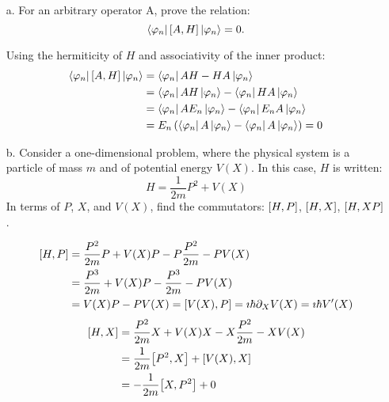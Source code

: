 \documentclass[a4paper,twoside]{article}
\begin{document}
\begin{itemize}
    \item[a.] For an arbitrary operator A, prove the relation:
        \begin{equation}
            \bra{\varphi_n} \comm{A}{H} \ket{\varphi_n} = 0.
        \end{equation}
        \begin{problem}
            Using the hermiticity of $ H $ and associativity of the inner product:
            \begin{align}
                \bra{\varphi_n} \comm{A}{H} \ket{\varphi_n} &= \bra{\varphi_n} AH-HA \ket{\varphi_n}\\
                &= \bra{\varphi_n} AH \ket{\varphi_n} - \bra{\varphi_n} HA \ket{\varphi_n}\\
                &= \bra{\varphi_n} AE_n \ket{\varphi_n} - \bra{\varphi_n} E_nA \ket{\varphi_n}\\
                &= E_n \left( \bra{\varphi_n} A \ket{\varphi_n} - \bra{\varphi_n} A \ket{\varphi_n} \right) = 0
            \end{align}
        \end{problem}
    \item[b.] Consider a one-dimensional problem, where the physical system is a particle of mass $ m $ and of potential energy $ V(X) $. In this case, $ H $ is written:
        \begin{equation}
            H = \frac{1}{2m} P^2 + V(X)
        \end{equation}
        \subitem[$\alpha$.] In terms of $ P $, $ X $, and $ V(X) $, find the commutators: $ \comm{H}{P} $, $ \comm{H}{X} $, $ \comm{H}{XP} $.
        \begin{problem}
            \begin{align}
                \comm{H}{P} &= \frac{P^2}{2m} P + V(X) P - P \frac{P^2}{2m} - P V(X)\\
                &= \frac{P^3}{2m} + V(X)P - \frac{P^3}{2m} - PV(X)\\
                &= V(X)P - PV(X) = \comm{V(X)}{P} = \imath\hbar\partial_X V(X) = \imath\hbar V'(X)
            \end{align}
            \begin{align}
                \comm{H}{X} &= \frac{P^2}{2m} X + V(X)X - X \frac{P^2}{2m} - XV(X)\\
                &= \frac{1}{2m} \comm{P^2}{X} + \comm{V(X)}{X}\\
                &= -\frac{1}{2m} \comm{X}{P^2} + 0\\

\end{align}
\end{problem}
\end{itemize}
\end{document}
